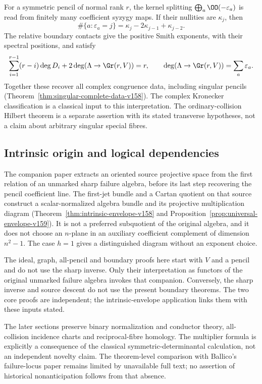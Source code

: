For a symmetric pencil of normal rank $r$, the kernel splitting
$\bigoplus_a\OO(-\varepsilon_a)$ is read from finitely many coefficient
syzygy maps. If their nullities are $\kappa_j$, then
\[
 \#\{a:\varepsilon_a=j\}=\kappa_j-2\kappa_{j-1}+\kappa_{j-2}.
\]
The relative boundary contacts give the positive Smith exponents,
with their spectral positions, and satisfy
\[
 \sum_{i=1}^{r-1}(r-i)\deg D_i+
          2\deg(\Lambda\to\Gr(r,V))=r,
 \qquad\deg(\Lambda\to\Gr(r,V))=\sum_a\varepsilon_a.
\]
Together these recover all complex congruence data, including singular
pencils (Theorem~\ref{thm:singular-complete-data-v158}). The complex
Kronecker classification is a classical input to this interpretation.
The ordinary-collision Hilbert theorem is a separate assertion with
its stated transverse hypotheses, not a claim about arbitrary singular
special fibres.

\subsection{Intrinsic origin and logical dependencies}
The companion paper extracts an oriented source projective space from
the first relation of an unmarked sharp failure algebra, before its
last step recovering the pencil coefficient line. The first-jet bundle
and a Cartan quotient on that source construct a scalar-normalized
algebra bundle and its projective multiplication diagram
(Theorem~\ref{thm:intrinsic-envelope-v158} and
Proposition~\ref{prop:universal-envelope-v159}). It is not a preferred
subquotient of the original algebra, and it does not choose an
$n$-plane in an auxiliary coefficient complement of dimension $n^2-1$.
The case $h=1$ gives a distinguished diagram without an exponent choice.

The ideal, graph, all-pencil and boundary proofs here start with $V$
and a pencil and do not use the sharp inverse. Only their interpretation
as functors of the original unmarked failure algebra invokes that
companion. Conversely, the sharp inverse and source descent do not
use the present boundary theorems. The two core proofs are independent;
the intrinsic-envelope application links them with these inputs stated.

The later sections preserve binary normalization and conductor theory,
all-collision incidence charts and reciprocal-fibre homology. The
multiplier formula is explicitly a consequence of the classical
symmetric-determinantal calculation, not an independent novelty claim.
The theorem-level comparison with Ballico's failure-locus paper
\cite{Ballico93} remains limited by unavailable full text; no assertion
of historical nonanticipation follows from that absence.

